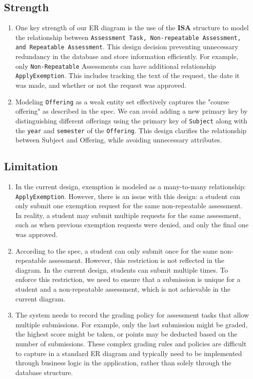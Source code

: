 \documentclass[12pt]{article}
\begin{document}
\subsection*{Strength}
\begin{enumerate}
    \item One key strength of our ER diagram is the use of the \textbf{ISA} structure to model the relationship between \texttt{Assessment Task, Non-repeatable Assessment, and Repeatable Assessment}. This design decision preventing unnecessary redundancy in the database and store information efficiently. For example, only \texttt{Non-Repeatable} Assessments can have additional relationship \texttt{ApplyExemption}. This includes tracking the text of the request, the date it was made, and whether or not the request was approved.

    \item Modeling \texttt{Offering} as a weak entity set effectively captures the "course offering" as described in the spec. We can avoid adding a new primary key by distinguishing different offerings using the primary key of \texttt{Subject} along with the \texttt{year} and \texttt{semester} of the \texttt{Offering}. This design clarifies the relationship between Subject and Offering, while avoiding unnecessary attributes.
\end{enumerate}

\subsection*{Limitation}
\begin{enumerate}
    \item In the current design, exemption is modeled as a many-to-many relationship: \texttt{ApplyExemption}. However, there is an issue with this design: a student can only submit one exemption request for the same non-repeatable assessment. In reality, a student may submit multiple requests for the same assessment, such as when previous exemption requests were denied, and only the final one was approved.

    \item According to the spec, a student can only submit once for the same non-repeatable assessment. However, this restriction is not reflected in the diagram. In the current design, students can submit multiple times. To enforce this restriction, we need to ensure that a submission is unique for a student and a non-repeatable assessment, which is not achievable in the current diagram.

    \item The system needs to record the grading policy for assessment tasks that allow multiple submissions. For example, only the last submission might be graded, the highest score might be taken, or points may be deducted based on the number of submissions. These complex grading rules and policies are difficult to capture in a standard ER diagram and typically need to be implemented through business logic in the application, rather than solely through the database structure.
\end{enumerate}
\end{document}
